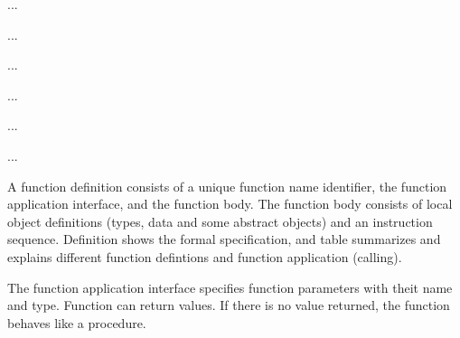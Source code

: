 \documentclass[a4paper,12pt,twoside,english]{article}
\begin{document}
\vskip5pt



\def\thesubsubsection{\tocXXX}
\secIII{\label{toclabelXXX}\thesubsubsection}
...


\vskip5pt



\def\thesubsubsection{\tocXXXI}
\secIII{\label{toclabelXXXI}\thesubsubsection}
...


\vskip5pt



\def\thesubsubsection{\tocXXXII}
\secIII{\label{toclabelXXXII}\thesubsubsection}
...


\vskip5pt



\def\thesubsubsection{\tocXXXIII}
\secIII{\label{toclabelXXXIII}\thesubsubsection}
...


\vskip5pt



\def\thesubsubsection{\tocXXXIV}
\secIII{\label{toclabelXXXIV}\thesubsubsection}
...


\vskip5pt



\def\thesubsubsection{\tocXXXV}
\secIII{\label{toclabelXXXV}\thesubsubsection}
...


\vskip5pt



\def\thesubsubsection{\vrule width 0pt height 1.3 ex}

\def\thesubsection{\tocXXXVI}
\secII{\label{toclabelXXXVI}\thesubsection}
A function definition consists of a unique function name identifier, the function application
interface, and the function body. The function body consists of local object definitions (types, data and some abstract objects) and an instruction sequence.
Definition  shows the formal specification, and table  summarizes and explains different function defintions and function
application (calling).


\vskip5pt
The function application interface specifies function parameters with theit name and type.  Function can return values. If there is no value returned, the
function behaves like a procedure. 
\end{document}
